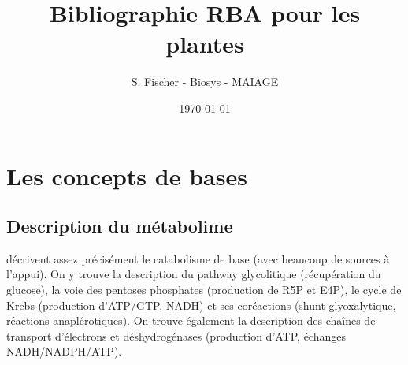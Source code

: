 \documentclass[12pt]{scrartcl}
\theoremstyle{definition}
\theoremstyle{remark}
\numberwithin{equation}{section}
\begin{document}
\title{Bibliographie RBA pour les plantes}%
\author{S. Fischer - Biosys - MAIAGE}%
\date{\today}%

\maketitle

\newpage

\tableofcontents

\newpage

\section{Les concepts de bases}




\subsection{Description du métabolime}
\citet{varma_metabolic_1993, varma_metabolic_1993-1} décrivent assez précisément le catabolisme de base (avec beaucoup de sources à l'appui). On y trouve la description du pathway glycolitique (récupération du glucose), la voie des pentoses phosphates (production de R5P et E4P), le cycle de Krebs (production d'ATP/GTP, NADH) et ses coréactions (shunt glyoxalytique, réactions anaplérotiques). On trouve également la description des chaînes de transport d'électrons et déshydrogénases (production d'ATP, échanges NADH/NADPH/ATP).



\end{document}
